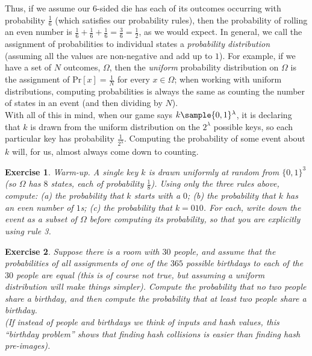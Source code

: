 \documentclass[12pt]{article}
\newcommand{\pr}[1]{\text{Pr}\left[#1\right]}
\newtheorem{exercise}{Exercise}
\theoremstyle{definition}
\theoremstyle{remark}
\theoremstyle{definition}
\begin{document}
Thus, if we assume our $6$-sided die has each of its outcomes occurring with probability $\frac{1}{6}$ (which satisfies our probability rules), then the probability of rolling an even number is $\frac{1}{6} + \frac{1}{6} + \frac{1}{6} = \frac{3}{6} = \frac{1}{2}$, as we would expect. In general, we call the assignment of probabilities to individual states a \emph{probability distribution} (assuming all the values are non-negative and add up to $1$). For example, if we have a set of $N$ outcomes, $\Omega$, then the \emph{uniform} probability distribution on $\Omega$ is the assignment of $\pr{x} = \frac{1}{N}$ for every $x\in\Omega$; when working with uniform distributions, computing probabilities is always the same as counting the number of states in an event (and then dividing by $N$).\\

With all of this in mind, when our game says $k \sample \{0,1\}^\lambda$, it is declaring that $k$ is drawn from the uniform distribution on the $2^\lambda$ possible keys, so each particular key has probability $\frac{1}{2^\lambda}$. Computing the probability of some event about $k$ will, for us, almost always come down to counting.

\begin{exercise}\label{ex:warmup-counting}
Warm-up. A single key $k$ is drawn uniformly at random from $\{0,1\}^3$ (so $\Omega$ has $8$ states, each of probability $\frac{1}{8}$). Using only the three rules above, compute: (a) the probability that $k$ starts with a $0$; (b) the probability that $k$ has an even number of $1$s; (c) the probability that $k = 010$. For each, write down the event as a subset of $\Omega$ before computing its probability, so that you are explicitly using rule 3.
\end{exercise}

\begin{exercise}
Suppose there is a room with $30$ people, and assume that the probabilities of all assignments of one of the $365$ possible birthdays to each of the $30$ people are equal (this is of course not true, but assuming a uniform distribution will make things simpler). Compute the probability that no two people share a birthday, and then compute the probability that at least two people share a birthday.\\
(If instead of people and birthdays we think of inputs and hash values, this ``birthday problem'' shows that finding hash collisions is easier than finding hash pre-images).
\end{exercise}
\end{document}
